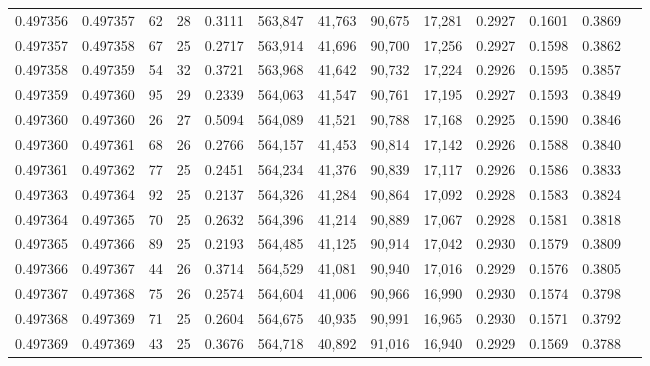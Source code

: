\begin{tabular}{rrrrrrrrrrrrr}
0.497356 & 0.497357 &  62 &  28 &                                     0.3111 & 563,847 &  41,763 &  90,675 &  17,281 & 0.2927 & 0.1601 & 0.3869 \\
0.497357 & 0.497358 &  67 &  25 &                                     0.2717 & 563,914 &  41,696 &  90,700 &  17,256 & 0.2927 & 0.1598 & 0.3862 \\
0.497358 & 0.497359 &  54 &  32 &                                     0.3721 & 563,968 &  41,642 &  90,732 &  17,224 & 0.2926 & 0.1595 & 0.3857 \\
0.497359 & 0.497360 &  95 &  29 &                                     0.2339 & 564,063 &  41,547 &  90,761 &  17,195 & 0.2927 & 0.1593 & 0.3849 \\
0.497360 & 0.497360 &  26 &  27 &                                     0.5094 & 564,089 &  41,521 &  90,788 &  17,168 & 0.2925 & 0.1590 & 0.3846 \\
0.497360 & 0.497361 &  68 &  26 &                                     0.2766 & 564,157 &  41,453 &  90,814 &  17,142 & 0.2926 & 0.1588 & 0.3840 \\
0.497361 & 0.497362 &  77 &  25 &                                     0.2451 & 564,234 &  41,376 &  90,839 &  17,117 & 0.2926 & 0.1586 & 0.3833 \\
0.497363 & 0.497364 &  92 &  25 &                                     0.2137 & 564,326 &  41,284 &  90,864 &  17,092 & 0.2928 & 0.1583 & 0.3824 \\
0.497364 & 0.497365 &  70 &  25 &                                     0.2632 & 564,396 &  41,214 &  90,889 &  17,067 & 0.2928 & 0.1581 & 0.3818 \\
0.497365 & 0.497366 &  89 &  25 &                                     0.2193 & 564,485 &  41,125 &  90,914 &  17,042 & 0.2930 & 0.1579 & 0.3809 \\
0.497366 & 0.497367 &  44 &  26 &                                     0.3714 & 564,529 &  41,081 &  90,940 &  17,016 & 0.2929 & 0.1576 & 0.3805 \\
0.497367 & 0.497368 &  75 &  26 &                                     0.2574 & 564,604 &  41,006 &  90,966 &  16,990 & 0.2930 & 0.1574 & 0.3798 \\
0.497368 & 0.497369 &  71 &  25 &                                     0.2604 & 564,675 &  40,935 &  90,991 &  16,965 & 0.2930 & 0.1571 & 0.3792 \\
0.497369 & 0.497369 &  43 &  25 &                                     0.3676 & 564,718 &  40,892 &  91,016 &  16,940 & 0.2929 & 0.1569 & 0.3788 \\

\end{tabular}
